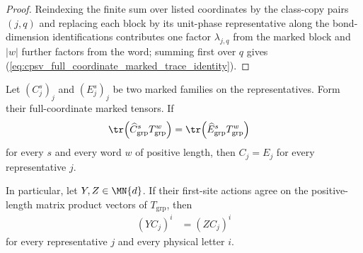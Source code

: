 \begin{proof}\leanok
    Reindexing the finite sum over listed coordinates by the
    class-copy pairs $(j,q)$ and replacing each block by its unit-phase
    representative along the bond-dimension identifications contributes one
    factor $\lambda_{j,q}$ from the marked block and $|w|$ further factors
    from the word; summing first over $q$ gives
    (\ref{eq:cpsv_full_coordinate_marked_trace_identity}).
\end{proof}

\begin{lemma}
    \label{thm:cpsv_retained_representative_grouped_lemma_l}
    \leanok
    Let $(C_j^s)_j$ and $(E_j^s)_j$ be two marked families on the
    representatives. Form their full-coordinate marked tensors. If
    \begin{align}
        \tr\!\left(\widehat C_{\mathrm{grp}}^sT_{\mathrm{grp}}^w\right)
         & =\tr\!\left(\widehat E_{\mathrm{grp}}^sT_{\mathrm{grp}}^w\right)
        \label{eq:cpsv_retained_marked_trace_agreement}
    \end{align}
    for every $s$ and every word $w$ of positive length, then $C_j=E_j$ for
    every representative $j$.

    In particular, let $Y,Z\in\MN{d}$. If their first-site actions agree on
    the positive-length matrix product vectors of $T_{\mathrm{grp}}$, then
    \begin{align}
        (YC_j)^i & =(ZC_j)^i
        \label{eq:cpsv_retained_first_site_action}
    \end{align}
    for every representative $j$ and every physical letter $i$.
\end{lemma}


